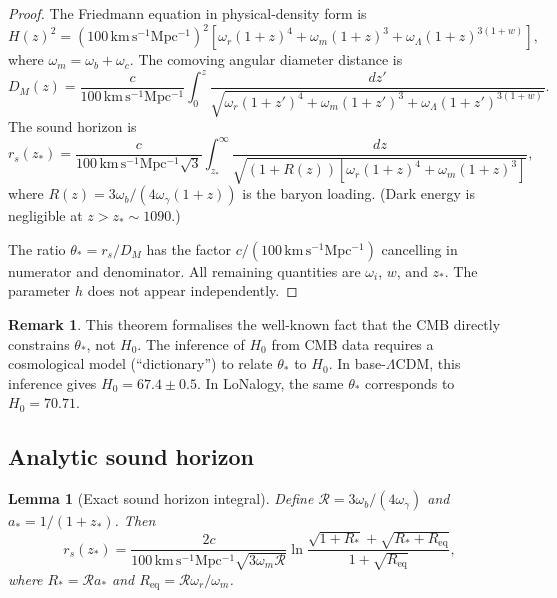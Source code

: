 \documentclass[12pt]{article}
\theoremstyle{plain}
\newtheorem{lemma}[theorem]{Lemma}
\theoremstyle{definition}
\newtheorem{remark}[theorem]{Remark}
\numberwithin{equation}{section}
\begin{document}
\begin{proof}
The Friedmann equation in physical-density form is
\begin{equation}
H(z)^2 = (100\,\mathrm{km\,s^{-1}Mpc^{-1}})^2
\left[\omega_r(1+z)^4+\omega_m(1+z)^3+\omega_\Lambda(1+z)^{3(1+w)}\right],
\end{equation}
where $\omega_m=\omega_b+\omega_c$.  The comoving angular diameter distance is
\begin{equation}
D_M(z) = \frac{c}{100\,\mathrm{km\,s^{-1}Mpc^{-1}}}
\int_0^z\frac{dz'}{\sqrt{\omega_r(1+z')^4+\omega_m(1+z')^3+\omega_\Lambda(1+z')^{3(1+w)}}}.
\end{equation}
The sound horizon is
\begin{equation}
r_s(z_*) = \frac{c}{100\,\mathrm{km\,s^{-1}Mpc^{-1}}\sqrt{3}}
\int_{z_*}^{\infty}\frac{dz}{\sqrt{(1+R(z))[\omega_r(1+z)^4+\omega_m(1+z)^3]}},
\end{equation}
where $R(z)=3\omega_b/(4\omega_\gamma(1+z))$ is the baryon loading.
(Dark energy is negligible at $z>z_*\sim1090$.)

The ratio $\theta_*=r_s/D_M$ has the factor
$c/(100\,\mathrm{km\,s^{-1}Mpc^{-1}})$ cancelling in numerator and denominator.
All remaining quantities are $\omega_i$, $w$, and $z_*$.
The parameter $h$ does not appear independently.
\end{proof}

\begin{remark}
This theorem formalises the well-known fact that the CMB directly constrains
$\theta_*$, not $H_0$.  The inference of $H_0$ from CMB data requires a
cosmological model (``dictionary'') to relate $\theta_*$ to $H_0$.
In base-$\Lambda$CDM, this inference gives $H_0=67.4\pm0.5$.
In LoNalogy, the same $\theta_*$ corresponds to $H_0=70.71$.
\end{remark}


\subsection{Analytic sound horizon}

\begin{lemma}[Exact sound horizon integral]\label{lem:rsexact}
Define $\mathcal{R}=3\omega_b/(4\omega_\gamma)$ and $a_*=1/(1+z_*)$.  Then
\begin{equation}\label{eq:rsexact}
\boxed{r_s(z_*) = \frac{2c}{100\,\mathrm{km\,s^{-1}Mpc^{-1}}\sqrt{3\omega_m\mathcal{R}}}
\ln\frac{\sqrt{1+R_*}+\sqrt{R_*+R_{\mathrm{eq}}}}{1+\sqrt{R_{\mathrm{eq}}}},}
\end{equation}
where $R_*=\mathcal{R}a_*$ and $R_{\mathrm{eq}}=\mathcal{R}\omega_r/\omega_m$.
\end{lemma}
\end{document}

